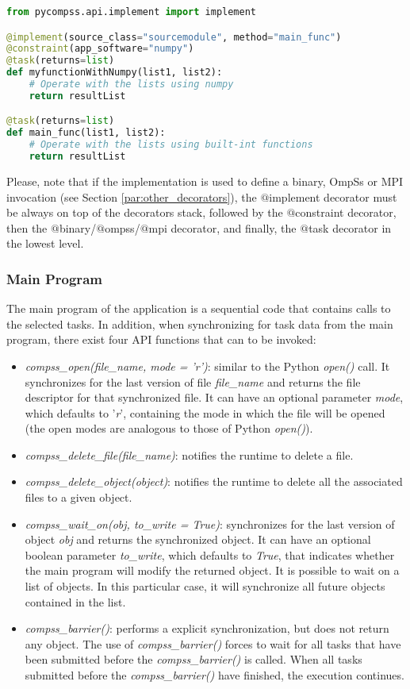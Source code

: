\begin{lstlisting}[language=python]
from pycompss.api.implement import implement

@implement(source_class="sourcemodule", method="main_func")
@constraint(app_software="numpy")
@task(returns=list)
def myfunctionWithNumpy(list1, list2):
    # Operate with the lists using numpy
    return resultList

@task(returns=list)
def main_func(list1, list2):
    # Operate with the lists using built-int functions
    return resultList
\end{lstlisting}

Please, note that if the implementation is used to define a binary, OmpSs or MPI invocation (see Section 
\ref{par:other_decorators}), the $@$implement decorator must be always on top of the decorators stack,
followed by the $@$constraint decorator, then the $@$binary/$@$ompss/$@$mpi decorator, and finally, 
the $@$task decorator in the lowest level.

\subsubsection{Main Program}
The main program of the application is a sequential code that contains calls to the selected tasks. 
In addition, when synchronizing for task data from the main program, 
there exist four API functions that can to be invoked:

\begin{itemize}
 \item {\it compss\_open(file\_name, mode = 'r')}: similar to the Python {\it open()} call. It synchronizes
       for the last version of file {\it file\_name} and returns the file descriptor for that synchronized
       file. It can have an optional parameter {\it mode}, which defaults to '{\it r}', containing the
       mode in which the file will be opened (the open modes are analogous to those of
       Python {\it open()}).
 \item {\it compss\_delete\_file(file\_name)}: notifies the runtime to delete a file.
 \item {\it compss\_delete\_object(object)}: notifies the runtime to delete all the associated files to
 a given object.
 \item {\it compss\_wait\_on(obj, to\_write = True)}: synchronizes for the last version of object {\it obj}
       and returns the synchronized object. It can have an optional boolean parameter
       {\it to\_write}, which defaults to {\it True}, that indicates whether the main program will modify the
       returned object.       
       It is possible to wait on a list of objects. In this particular case, it will synchronize all future objects 
       contained in the list.
 \item {\it compss\_barrier()}: performs a explicit synchronization, but does not return any object. The use of {\it compss\_barrier()}
       forces to wait for all tasks that have been submitted before the {\it compss\_barrier()} is called.
       When all tasks submitted before the {\it compss\_barrier()} have finished, the execution continues.
\end{itemize}

